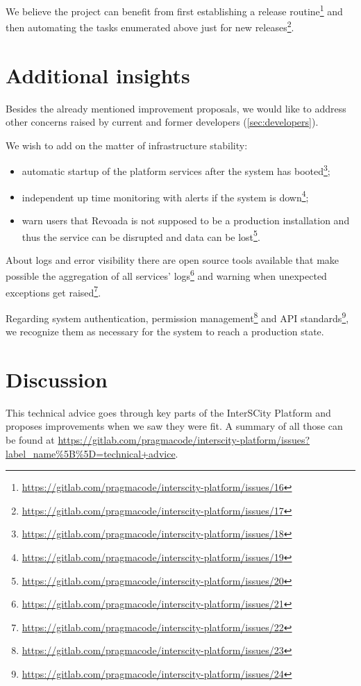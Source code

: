 \documentclass[paper=a4, fontsize=11pt]{scrartcl}
\numberwithin{equation}{section}    %
\numberwithin{figure}{section}      %
\numberwithin{table}{section}        %
\begin{document}
  We believe the project can benefit from first establishing a release routine\footnote{\url{https://gitlab.com/pragmacode/interscity-platform/issues/16}} and then automating the tasks enumerated above just for new releases\footnote{\url{https://gitlab.com/pragmacode/interscity-platform/issues/17}}.

\section{Additional insights}
\label{sec:addtinsights}
  Besides the already mentioned improvement proposals, we would like to address other concerns raised by current and former developers (\ref{sec:developers}).

  We wish to add on the matter of infrastructure stability:

  \begin{itemize}
    \item automatic startup of the platform services after the system has booted\footnote{\url{https://gitlab.com/pragmacode/interscity-platform/issues/18}};
    \item independent up time monitoring with alerts if the system is down\footnote{\url{https://gitlab.com/pragmacode/interscity-platform/issues/19}};
    \item warn users that Revoada is not supposed to be a production installation and thus the service can be disrupted and data can be lost\footnote{\url{https://gitlab.com/pragmacode/interscity-platform/issues/20}}.
  \end{itemize}

  About logs and error visibility there are open source tools available that make possible the aggregation of all services' logs\footnote{\url{https://gitlab.com/pragmacode/interscity-platform/issues/21}} and warning when unexpected exceptions get raised\footnote{\url{https://gitlab.com/pragmacode/interscity-platform/issues/22}}.

  Regarding system authentication, permission management\footnote{\url{https://gitlab.com/pragmacode/interscity-platform/issues/23}} and API standards\footnote{\url{https://gitlab.com/pragmacode/interscity-platform/issues/24}}, we recognize them as necessary for the system to reach a production state.

\section{Discussion}
\label{sec:discussion}
  This technical advice goes through key parts of the InterSCity Platform and proposes improvements when we saw they were fit. A summary of all those can be found at \url{https://gitlab.com/pragmacode/interscity-platform/issues?label_name\%5B\%5D=technical+advice}.
\end{document}
